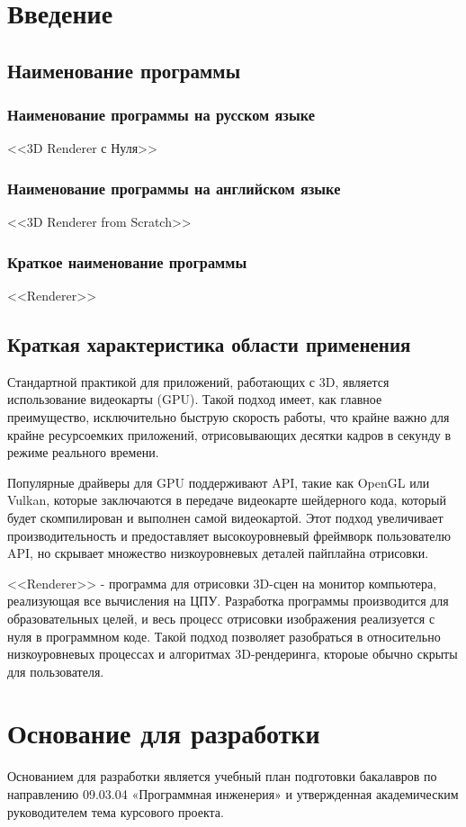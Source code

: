 \section{Введение}

\subsection{Наименование программы}

\subsubsection{Наименование программы на русском языке}

<<3D Renderer с Нуля>>

\subsubsection{Наименование программы на английском языке}

<<3D Renderer from Scratch>>

\subsubsection{Краткое наименование программы}

<<Renderer>>

\subsection{Краткая характеристика области применения}
Стандартной практикой для приложений, работающих с 3D, является использование видеокарты (GPU). Такой подход имеет, как главное преимущество, исключительно быструю скорость работы, что крайне важно для крайне ресурсоемких приложений, отрисовывающих десятки кадров в секунду в режиме реального времени.

Популярные драйверы для GPU поддерживают API, такие как OpenGL или Vulkan, которые заключаются в передаче видеокарте шейдерного кода, который будет скомпилирован и выполнен самой видеокартой. Этот подход увеличивает производительность и предоставляет высокоуровневый фреймворк пользователю API, но 
скрывает множество низкоуровневых деталей пайплайна отрисовки.

<<Renderer>> - программа для отрисовки 3D-сцен на монитор компьютера, реализующая все вычисления на ЦПУ. Разработка программы производится для образовательных целей, и весь процесс отрисовки изображения реализуется с нуля в программном коде. Такой подход позволяет разобраться в относительно низкоуровневых процессах и алгоритмах 3D-рендеринга, ктороые обычно скрыты для пользователя.

\section{Основание для разработки}

Основанием для разработки является учебный план подготовки бакалавров по направлению 09.03.04 «Программная инженерия» и утвержденная академическим руководителем тема курсового проекта.
